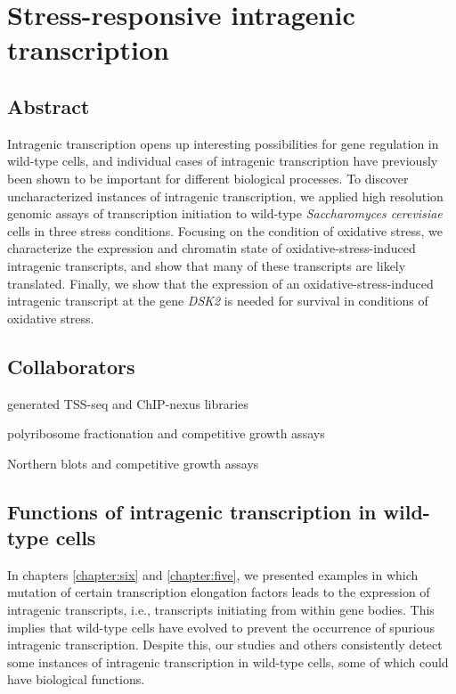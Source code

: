\chapter{Stress-responsive intragenic transcription}
\label{chapter:stress}

\section{Abstract}

Intragenic transcription opens up interesting possibilities for gene regulation in wild-type cells, and individual cases of intragenic transcription have previously been shown to be important for different biological processes.
To discover uncharacterized instances of intragenic transcription, we applied high resolution genomic assays of transcription initiation to wild-type \textit{Saccharomyces cerevisiae} cells in three stress conditions.
Focusing on the condition of oxidative stress, we characterize the expression and chromatin state of oxidative-stress-induced intragenic transcripts, and show that many of these transcripts are likely translated.
Finally, we show that the expression of an oxidative-stress-induced intragenic transcript at the gene \textit{DSK2} is needed for survival in conditions of oxidative stress.

\section{Collaborators}

\begin{description}[align=right, labelwidth=5cm, noitemsep, leftmargin=!]
    \item [Steve Doris] generated TSS-seq and ChIP-nexus libraries
    \item [Dan Spatt] polyribosome fractionation and competitive growth assays
    \item [James Warner] Northern blots and competitive growth assays
\end{description}

\section{Functions of intragenic transcription in wild-type cells}

In chapters \ref{chapter:six} and \ref{chapter:five}, we presented examples in which mutation of certain transcription elongation factors leads to the expression of intragenic transcripts, i.e., transcripts initiating from within gene bodies.
This implies that wild-type cells have evolved to prevent the occurrence of spurious intragenic transcription.
Despite this, our studies and others \citep{malabat2015, pelechano2013} consistently detect some instances of intragenic transcription in wild-type cells, some of which could have biological functions.

